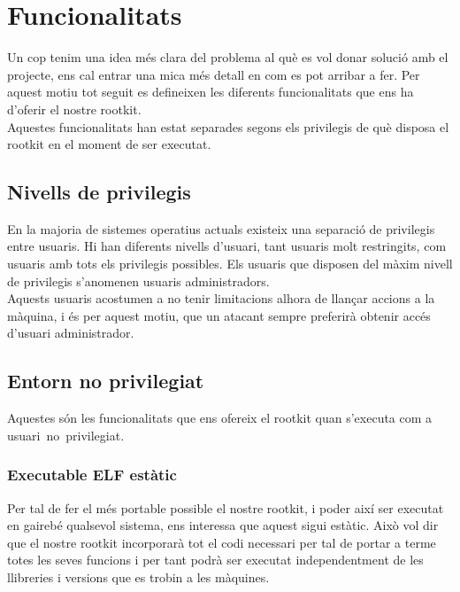 \chapter{Funcionalitats} \label{cap:funcionalitats}

Un cop tenim una idea més clara del problema al què es vol donar solució amb el projecte, ens cal entrar una mica més
detall en com es pot arribar a fer. Per aquest motiu tot seguit es defineixen les diferents funcionalitats 
que ens ha d'oferir el nostre rootkit. \\

Aquestes funcionalitats han estat separades segons els privilegis de què disposa el rootkit en el moment de ser
executat.

\section{Nivells de privilegis}

En la majoria de sistemes operatius actuals existeix una separació de privilegis entre usuaris. Hi
han diferents nivells d'usuari, tant usuaris molt restringits, com usuaris amb tots els privilegis
possibles. Els usuaris que disposen del màxim nivell de privilegis s'anomenen usuaris administradors. \\
Aquests usuaris acostumen a no tenir limitacions alhora de llançar accions a la màquina, i és per aquest
motiu, que un atacant sempre preferirà obtenir accés d'usuari administrador. \\

\section{Entorn no privilegiat} \label{sec:func-no-priv}

Aquestes són les funcionalitats que ens ofereix el rootkit quan s'executa com a \mbox{usuari no privilegiat}.

\subsection{Executable ELF estàtic}
Per tal de fer el més portable possible el nostre rootkit, i poder així ser executat en gairebé qualsevol sistema, ens 
interessa que aquest sigui estàtic. Això vol dir que el nostre rootkit incorporarà tot el codi necessari per tal de portar 
a terme totes les seves funcions i per tant podrà ser executat independentment de les llibreries i versions que es trobin a
les màquines. \\

